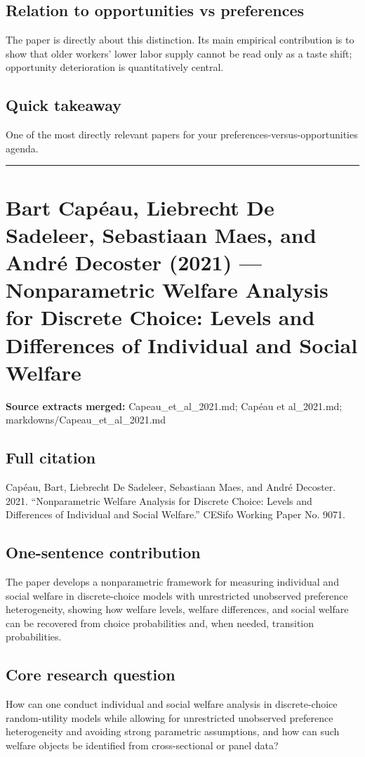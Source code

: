 \documentclass[11pt,a4paper]{article}
\begin{document}
\subsection*{Relation to opportunities vs preferences}
The paper is directly about this distinction. Its main empirical contribution is to show that older workers’ lower labor supply cannot be read only as a taste shift; opportunity deterioration is quantitatively central.

\subsection*{Quick takeaway}
One of the most directly relevant papers for your preferences-versus-opportunities agenda.


\medskip\hrule\medskip

\section*{Bart Capéau, Liebrecht De Sadeleer, Sebastiaan Maes, and André Decoster (2021) — Nonparametric Welfare Analysis for Discrete Choice: Levels and Differences of Individual and Social Welfare}

\textbf{Source extracts merged:} Capeau\_et\_al\_2021.md; Capéau et al\_2021.md; markdowns/Capeau\_et\_al\_2021.md

\subsection*{Full citation}
Capéau, Bart, Liebrecht De Sadeleer, Sebastiaan Maes, and André Decoster. 2021. “Nonparametric Welfare Analysis for Discrete Choice: Levels and Differences of Individual and Social Welfare.” CESifo Working Paper No. 9071.

\subsection*{One-sentence contribution}
The paper develops a nonparametric framework for measuring individual and social welfare in discrete-choice models with unrestricted unobserved preference heterogeneity, showing how welfare levels, welfare differences, and social welfare can be recovered from choice probabilities and, when needed, transition probabilities.

\subsection*{Core research question}
How can one conduct individual and social welfare analysis in discrete-choice random-utility models while allowing for unrestricted unobserved preference heterogeneity and avoiding strong parametric assumptions, and how can such welfare objects be identified from cross-sectional or panel data?
\end{document}
